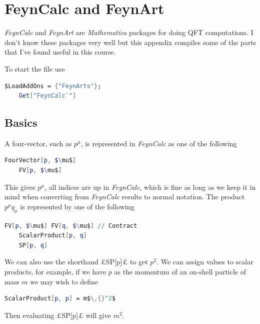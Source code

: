 \chapter{FeynCalc and FeynArt}
\textit{FeynCalc} and \textit{FeynArt} are \textit{Mathematica} packages for doing QFT computations.
I don't know these packages very well but this appendix compiles some of the parts that I've found useful in this course.

To start the file use
\begin{lstlisting}[language=mathematica, gobble=4]
    $LoadAddOns = {"FeynArts"};
    Get["FeynCalc`"]
\end{lstlisting}

\section{Basics}
A four-vector, such as \(p^\mu\), is represented in \textit{FeynCalc} as one of the following
\begin{lstlisting}[language=mathematica, gobble=4, mathescape]
    FourVector[p, $\mu$]
    FV[p, $\mu$]
\end{lstlisting}
This gives \(p^\mu\), all indices are up in \textit{FeynCalc}, which is fine as long as we keep it in mind when converting from \textit{FeynCalc} results to normal notation.
The product \(p^\mu q_\mu\) is represented by one of the following
\begin{lstlisting}[language=mathematica, gobble=4, mathescape]
    FV[p, $\mu$] FV[q, $\mu$] // Contract
    ScalarProduct[p, q]
    SP[p, q]
\end{lstlisting}
We can also use the shorthand £SP[p]£ to get \(p^2\).
We can assign values to scalar products, for example, if we have \(p\) as the momentum of an on-shell particle of mass \(m\) we may wish to define
\begin{lstlisting}[language=mathematica, gobble=4, mathescape]
    ScalarProduct[p, p] = m$\,{}^2$
\end{lstlisting}
Then evaluating £SP[p]£ will give \(m^2\).

